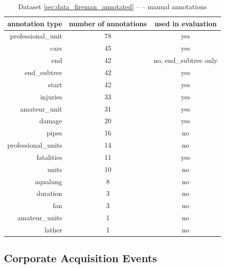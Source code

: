 \begin{table}
\centering
\begin{tabular}{|r||c|c|}
\hline
\textbf{annotation type} & \textbf{number of annotations} & \textbf{used in evaluation}\\
\hline
\hline
professional\_unit & 78 & yes\\
\hline
cars & 45 & yes\\
\hline
end & 42 & no, end\_subtree only\\
\hline
end\_subtree & 42 & yes\\
\hline
start & 42 & yes\\
\hline
injuries & 33 & yes\\
\hline
amateur\_unit & 31 & yes\\
\hline
damage & 20 & yes\\
\hline
pipes & 16 & no\\
\hline
professional\_units & 14 & no\\
\hline
fatalities & 11 & yes\\
\hline
units & 10 & no\\
\hline
aqualung & 8 & no\\
\hline
duration & 3 & no\\
\hline
fan & 3 & no\\
\hline
amateur\_units & 1 & no\\
\hline
lather & 1 & no\\
\hline
\end{tabular}
\caption{Dataset \ref{sec:data_fireman_annotated} --  -- manual annotations} \label{tab:data_fire_with}
\end{table}








\subsection{Corporate Acquisition Events} \label{sec:data_corporate_acquisitions}

